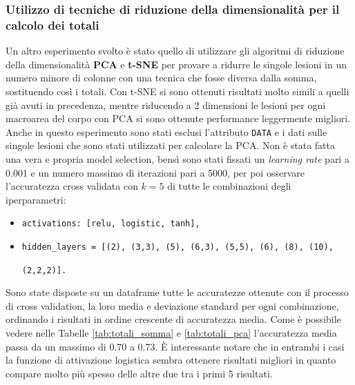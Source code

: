 \documentclass[12pt, twoside, letterpaper]{report}
\begin{document}
			\subsubsection{Utilizzo di tecniche di riduzione della dimensionalità per il calcolo dei totali} \label{par:pca_totali}
				Un altro esperimento svolto è stato quello di utilizzare gli algoritmi di riduzione della dimensionalità \textbf{PCA} e \textbf{t-SNE} per provare a ridurre le singole lesioni in un numero minore di colonne con una tecnica che fosse diversa dalla somma, sostituendo così i totali. Con t-SNE si sono ottenuti risultati molto simili a quelli già avuti in precedenza, mentre riducendo a 2 dimensioni le lesioni per ogni macroarea del corpo con PCA si sono ottenute performance leggermente migliori. Anche in questo esperimento sono stati esclusi l'attributo \texttt{DATA} e i dati sulle singole lesioni che sono stati utilizzati per calcolare la PCA. Non è stata fatta una vera e propria model selection, bensì sono stati fissati un \textit{learning rate} pari a 0.001 e un numero massimo di iterazioni pari a 5000, per poi osservare l'accuratezza cross validata con $k=5$ di tutte le combinazioni degli iperparametri: 
				\begin{itemize}
					\item \texttt{activations: [relu, logistic, tanh],}
    				\item \texttt{hidden\_layers = [(2), (3,3), (5), (6,3), (5,5), (6), (8), (10),} 
    				
    				\texttt{(2,2,2)].}
				\end{itemize}
				Sono state disposte su un dataframe tutte le accuratezze ottenute con il processo di cross validation, la loro media e deviazione standard per ogni combinazione, ordinando i risultati in ordine crescente di accuratezza media. Come è possibile vedere nelle Tabelle \ref{tab:totali_somma} e \ref{tab:totali_pca} l'accuratezza media passa da un massimo di 0.70 a 0.73. È interessante notare che in entrambi i casi la funzione di attivazione logistica sembra ottenere risultati migliori in quanto compare molto più spesso delle altre due tra i primi 5 risultati.
\end{document}
